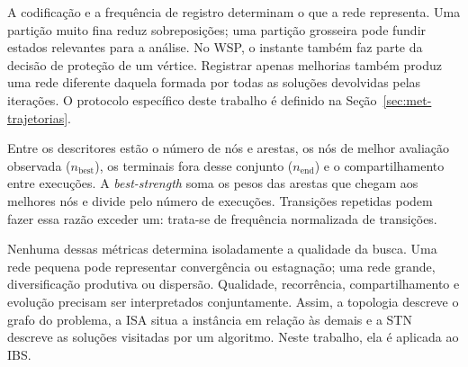 A codificação e a frequência de registro determinam o que a rede representa.
Uma partição muito fina reduz sobreposições; uma partição grosseira pode
fundir estados relevantes para a análise. No WSP, o instante também faz
parte da decisão de proteção de um vértice. Registrar apenas
melhorias também produz uma rede diferente daquela formada por todas as
soluções devolvidas pelas iterações. O protocolo específico deste trabalho
é definido na Seção~\ref{sec:met-trajetorias}.

Entre os descritores estão o número de nós e arestas, os nós de melhor
avaliação observada ($n_{\mathrm{best}}$), os terminais fora desse conjunto
($n_{\mathrm{end}}$) e o compartilhamento entre execuções. A
\textit{best-strength} soma os pesos das arestas que chegam aos melhores
nós e divide pelo número de execuções. Transições repetidas podem fazer
essa razão exceder um: trata-se de frequência normalizada de transições.

Nenhuma dessas métricas determina isoladamente a qualidade da busca.
Uma rede pequena pode representar convergência ou estagnação; uma rede
grande, diversificação produtiva ou dispersão. Qualidade, recorrência,
compartilhamento e evolução precisam ser interpretados conjuntamente.
Assim, a topologia descreve o grafo do problema, a ISA situa a instância
em relação às demais e a STN descreve as soluções visitadas por um algoritmo. Neste trabalho,
ela é aplicada ao IBS.
